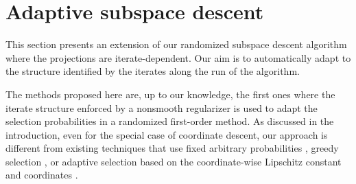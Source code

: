 \section{Adaptive subspace descent}
\label{sec:mor-adaptive-subspace}

{This section presents an extension of our randomized subspace descent algorithm where the projections are iterate-dependent. %
Our aim is to automatically adapt to the structure identified by the iterates along the run of the algorithm.

The methods proposed here are, up to our knowledge, the first ones where the iterate structure enforced by a nonsmooth regularizer is used to adapt the selection probabilities in a randomized first-order method. As discussed in the introduction, even for the special case of coordinate descent, our approach is different from existing techniques that use fixed arbitrary probabilities \cite{richtarik2014iteration,necoara2014random}, greedy selection \cite{dhillon2011nearest,nutini2015coordinate,nutini2017let}, or adaptive selection 
based on the coordinate-wise Lipschitz constant and coordinates \cite{perekrestenko2017faster,namkoong2017adaptive,stich2017safe}. 





}
